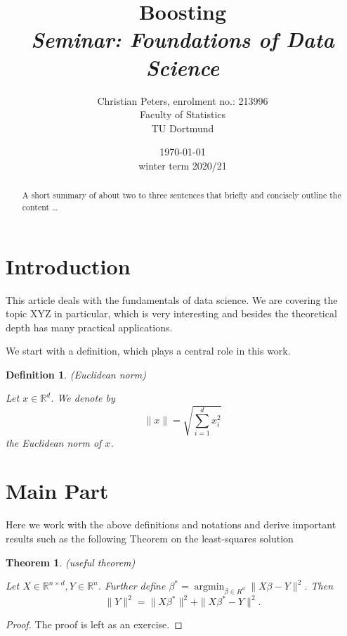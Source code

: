 \documentclass[a4paper,12pt]{article}
\title{Boosting\\
	\emph{Seminar: Foundations of Data Science}}
\author{Christian Peters, enrolment no.: 213996\\
	Faculty of Statistics\\
	TU Dortmund}
\date{\today\\
	winter term 
	2020/21}
\newtheorem{theorem}{Theorem}
\newtheorem{definition}{Definition}
\begin{document}
\maketitle
\linenumbers
\begin{abstract}
A short summary of about two to three sentences that briefly and concisely outline the content \ldots
\end{abstract}

\section{%
		Introduction}
This article deals with the fundamentals of data science. We are covering the topic XYZ in particular, which is very interesting and besides the theoretical depth has many practical applications.

We start with a definition, which plays a central role in this work.
\begin{definition}{%
				(Euclidean norm)}
\begin{linenomath*}
	Let $x\in\mathbb{R}^d$. We denote by $$\|x\|=\sqrt{\sum_{i=1}^{d} x_i^2}$$ the Euclidean norm of $x$.
\end{linenomath*}
\end{definition}
	
\section{Main Part}
\label{main_part}
Here we work with the above definitions and notations and derive important results such as the following Theorem on the least-squares solution

\begin{theorem}{(useful theorem)}
\label{thm:main}
\begin{linenomath*}
	Let $X\in\mathbb{R}^{n\times d}, Y\in\mathbb{R}^n$. Further define $\beta^* = \operatorname{argmin}_{\beta\in R^d}\|X\beta-Y\|^2$. Then $$\|Y\|^2=\|X\beta^*\|^2 + \|X\beta^* - Y\|^2.$$
\end{linenomath*}
\end{theorem}

\begin{proof}
	The proof is left as an exercise.
\end{proof}
\end{document}
